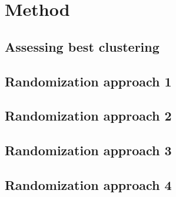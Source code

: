 \documentclass[a4paper,10pt]{article}
\theoremstyle{plain}
\theoremstyle{definition}
\begin{document}
\newpage
\section{Method}

\subsection{Assessing best clustering}

\subsection{Randomization approach 1}

\subsection{Randomization approach 2}

\subsection{Randomization approach 3}

\subsection{Randomization approach 4}
\end{document}
